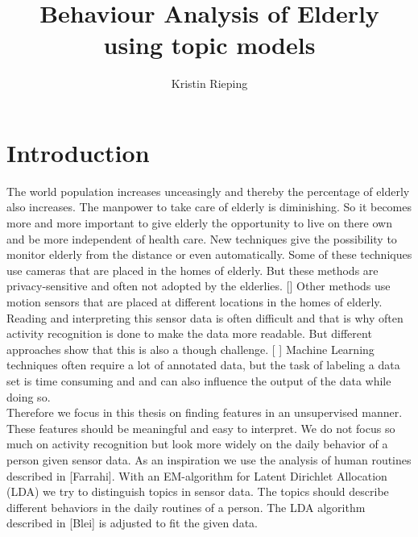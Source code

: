 \documentclass[11pt,a4paper]{article}
\title{Behaviour Analysis of Elderly using topic models}
\author{Kristin Rieping}
\begin{document}
\section{Introduction}
The world population increases unceasingly and thereby the percentage of elderly also increases. The manpower to take care of elderly is diminishing. So it becomes more and more important to give elderly the opportunity to live on there own and be more independent of health care.
New techniques give the possibility to monitor elderly from the distance or even automatically. Some of these techniques use cameras that are placed in the homes of elderly. But these methods are privacy-sensitive and often not adopted by the elderlies. []
Other methods use motion sensors that are placed at different locations in the homes of elderly. 
Reading and interpreting this sensor data is often difficult and that is why often activity recognition is done to make the data more readable. But different approaches show that this is also a though challenge. [ ]
Machine Learning techniques often require a lot of annotated data, but the task of labeling a data set is time consuming and and can also influence the output of the data while doing so.\\
Therefore we focus in this thesis on finding features in an unsupervised manner. These features should be meaningful and easy to interpret. We do not focus so much on activity recognition but look more widely on the daily behavior of a person given sensor data. As an inspiration we use the analysis of human routines described in [Farrahi]. With an EM-algorithm for Latent Dirichlet Allocation (LDA) we try to distinguish topics in sensor data. The topics should describe different behaviors in the daily routines of a person. The LDA algorithm described in [Blei] is adjusted to fit the given data.
\end{document}
